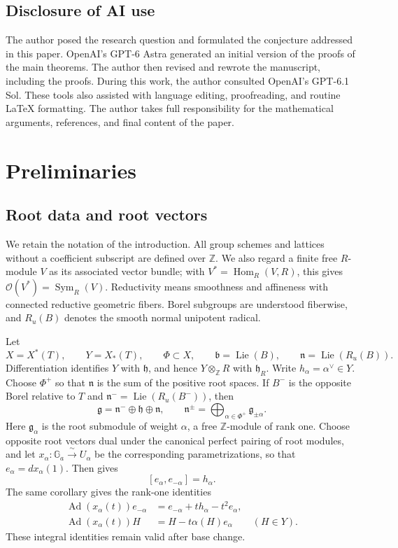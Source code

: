 \documentclass[twoside,a4paper,12pt,reqno]{amsart}
\theoremstyle{remark}
\numberwithin{equation}{section}
\newcommand{\Z}{\mathbb Z}
\newcommand{\cO}{\mathcal O}
\newcommand{\fg}{\mathfrak g}
\newcommand{\fh}{\mathfrak h}
\newcommand{\fn}{\mathfrak n}
\newcommand{\fB}{\mathfrak b}
\DeclareMathOperator{\Sym}{Sym}
\DeclareMathOperator{\Lie}{Lie}
\DeclareMathOperator{\Ad}{Ad}
\newcommand{\iso}{\xrightarrow{\ \sim\ }}
\begin{document}
\subsection{Disclosure of AI use}

The author posed the research question and formulated the conjecture addressed in this paper. OpenAI's GPT-6 Astra generated an initial version of the proofs of the main theorems. The author then revised and rewrote the manuscript, including the proofs. During this work, the author consulted OpenAI's GPT-6.1 Sol. These tools also assisted with language editing, proofreading, and routine \LaTeX{} formatting. The author takes full responsibility for the mathematical arguments, references, and final content of the paper.

\section{Preliminaries}\label{sec:preliminaries}

\subsection{Root data and root vectors}

We retain the notation of the introduction. All group schemes and lattices without a coefficient subscript are defined over \(\Z\). We also regard a finite free \(R\)-module \(V\) as its associated vector bundle; with \(V^*=\operatorname{Hom}_R(V,R)\), this gives \(\cO(V^*)=\Sym_R(V)\). Reductivity means smoothness and affineness with connected reductive geometric fibers. Borel subgroups are understood fiberwise, and \(R_u(B)\) denotes the smooth normal unipotent radical.

Let
\[
X=X^*(T),\qquad Y=X_*(T),\qquad
\Phi\subset X,\qquad
\fB=\Lie(B),\qquad \fn=\Lie(R_u(B)).
\]
Differentiation identifies \(Y\) with \(\fh\), and hence \(Y\otimes_\Z R\) with \(\fh_R\). Write \(h_\alpha=\alpha^\vee\in Y\). Choose \(\Phi^+\) so that \(\fn\) is the sum of the positive root spaces. If \(B^-\) is the opposite Borel relative to \(T\) and \(\fn^-=\Lie(R_u(B^-))\), then
\[
\fg=\fn^-\oplus\fh\oplus\fn,\qquad
\fn^\pm=\bigoplus_{\alpha\in\Phi^+}\fg_{\pm\alpha}.
\]
Here \(\fg_\alpha\) is the root submodule of weight \(\alpha\), a free \(\Z\)-module of rank one. Choose opposite root vectors dual under the canonical perfect pairing of root modules, and let \(x_\alpha:\mathbb G_a\iso U_\alpha\) be the corresponding parametrizations, so that \(e_\alpha=d x_\alpha(1)\). Then \cite[Thm.~4.2.6 and Cor.~5.1.12]{Conrad} gives
\[
[e_\alpha,e_{-\alpha}]=h_\alpha.
\]
The same corollary gives the rank-one identities
\[
\begin{aligned}
\Ad(x_\alpha(t))e_{-\alpha}
&=e_{-\alpha}+t h_\alpha-t^2e_\alpha,\\
\Ad(x_\alpha(t))H&=H-t\alpha(H)e_\alpha
\qquad(H\in Y).
\end{aligned}
\]
These integral identities remain valid after base change.
\end{document}
